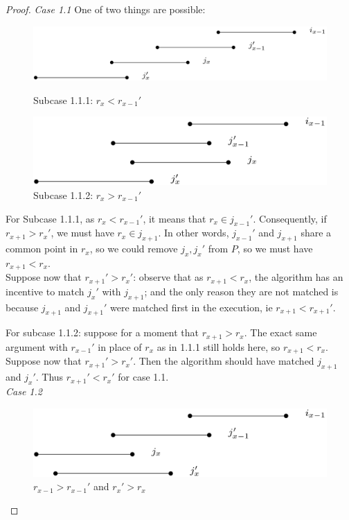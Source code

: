 \documentclass[12pt]{article}
\begin{document}
\begin{proof}
    \textit{Case 1.1}
    One of two things are possible:
    \begin{figure}[H]
        \centering
        \includegraphics[scale= 0.2]{induction_case_1.1_0.png}
        \caption{Subcase 1.1.1: $r_x < r_{x-1}'$}
        \includegraphics[scale=0.2]{induction_case_1.1_1.png}
        \caption{Subcase 1.1.2: $r_x > r_{x-1}'$}
    \end{figure}

    For Subcase 1.1.1, as $r_x < r_{x-1}'$, it means that $r_x \in j_{x-1}'$.
    Consequently, if $r_{x+1} > r_x'$, we must have $r_x \in j_{x+1}$. In other words, $j_{x-1}'$ and $j_{x+1}$ share a common point in $r_x$, so we could remove $j_x, j_x'$ from $P$, so we must have $r_{x+1} < r_x$. \\
    Suppose now that $r_{x+1}' > r_x'$: observe that as $r_{x+1} < r_x$, the algorithm has an incentive to match $j_x'$ with $j_{x+1}$; and the only reason they are not matched is because $j_{x+1}$ and $j_{x+1}'$ were matched first in the execution, ie $r_{x+1} < r_{x+1}'$.
    
    \vspace{\baselineskip} 
    For subcase 1.1.2: suppose for a moment that $r_{x+1} > r_{x}$. The exact same argument with $r_{x-1}'$ in place of $r_x$ as in 1.1.1 still holds here, so $r_{x+1} < r_x$.\\
    Suppose now that $r_{x+1}' > r_x'$. Then the algorithm should have matched $j_{x+1}$ and $j_x'$. Thus $r_{x+1}' < r_x'$ for case 1.1.\\

    

    \textit{Case 1.2}
    \vspace{\baselineskip}

    \begin{figure}[H]
        \centering
        \includegraphics[scale= 0.3]{induction_case_1.2.png}
        \caption{$r_{x-1} > r_{x-1}'$ and $r_x'>r_x$}
    \end{figure}


\end{proof}
\end{document}
